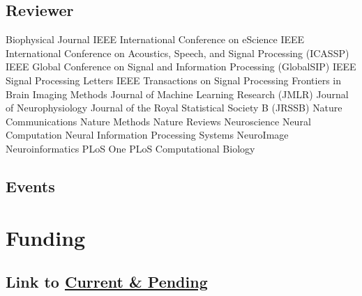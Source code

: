 \documentclass[10pt,colorlinks=true,urlcolor=blue]{moderncv}
\begin{document}
\subsection{Reviewer}
\cventry {} {Biophysical Journal} {}{}{}{}
\cventry {} {IEEE International Conference on eScience} {}{}{}{}
\cventry {} {IEEE International Conference on Acoustics, Speech, and Signal Processing (ICASSP)} {}{}{}{}
\cventry {} {IEEE Global Conference on Signal and Information Processing (GlobalSIP)} {} {} {} {}
\cventry {} {IEEE Signal Processing Letters} {} {} {} {}
\cventry {} {IEEE Transactions on Signal Processing} {}{}{}{}
\cventry {} {Frontiers in Brain Imaging Methods} {}{}{}{}
\cventry {} {Journal of Machine Learning Research (JMLR)} {}{}{}{}
\cventry {} {Journal of Neurophysiology} {}{}{}{}
\cventry {} {Journal of the Royal Statistical Society B (JRSSB)} {}{}{}{}
\cventry {} {Nature Communications} {}{}{}{}
\cventry {} {Nature Methods} {}{}{}{}
\cventry {} {Nature Reviews Neuroscience} {}{}{}{}
\cventry {} {Neural Computation} {}{}{}{}
\cventry {} {Neural Information Processing Systems} {}{}{}{}
\cventry {} {NeuroImage} {}{}{}{}
\cventry {} {Neuroinformatics} {}{}{}{}
\cventry {} {PLoS One} {}{}{}{}
\cventry {} {PLoS Computational Biology} {}{}{}{}


\subsection{Events}





\section{Funding}


\subsection{Link to \href{https://github.com/jovo/cv/raw/master/CP_Vogelstein.pdf}{Current \& Pending}}
\end{document}
